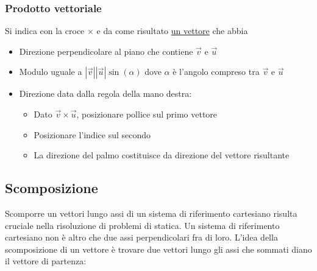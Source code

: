 \subsubsection{Prodotto vettoriale}
\label{prodvettoriale}
Si indica con la croce $ \times  $  e da come risultato \underline{un vettore} che abbia
\begin{itemize}
	\item Direzione perpendicolare al piano che contiene $ \vec{v} $ e $ \vec{u} $
	\item Modulo uguale a $ \left|\vec{v}\right| \left|\vec{u}\right|\sin \left(\alpha \right) $ dove $ \alpha  $ è l'angolo compreso tra $ \vec{v} $ e $ \vec{u} $
	\item Direzione data dalla regola della mano destra:
	      \begin{itemize}
		      \item Dato $ \vec{v} \times \vec{u} $, posizionare pollice sul primo vettore
		      \item Posizionare l'indice sul secondo
		      \item La direzione del palmo costituisce da direzione del vettore risultante
	      \end{itemize}
\end{itemize}
\vskip3mm

\subsection{Scomposizione}\label{scomposizionevettori}
Scomporre un vettori lungo assi di un sistema di riferimento cartesiano risulta cruciale nella risoluzione di problemi di statica. Un sistema di riferimento cartesiano non è altro che due assi perpendicolari fra di loro.
\vskip3mm
L'idea della scomposizione di un vettore è trovare due vettori lungo gli assi che sommati diano il vettore di partenza:

